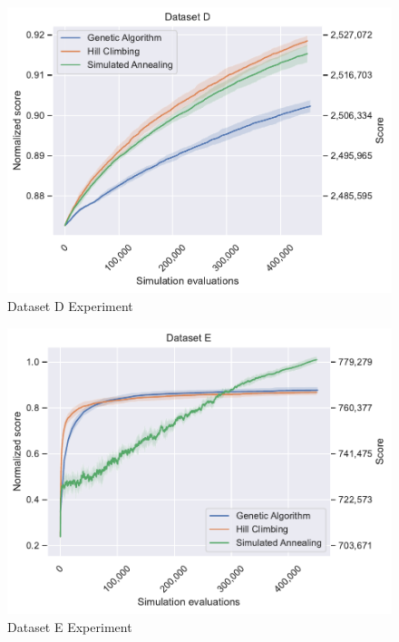 \begin{figure}
    \centering
    \includegraphics[width=\linewidth]{img/experiments/d_Genetic Algorithm_Hill Climbing_Simulated Annealing.pdf}
    \caption[Dataset D Experiment]{
        Dataset D Experiment
    }
    \label{fig:dataset_d_experiment}
\end{figure}

\begin{figure}
    \centering
    \includegraphics[width=\linewidth]{img/experiments/e_Genetic Algorithm_Hill Climbing_Simulated Annealing.pdf}
    \caption[Dataset E Experiment]{
        Dataset E Experiment
    }
    \label{fig:dataset_e_experiment}
\end{figure}

